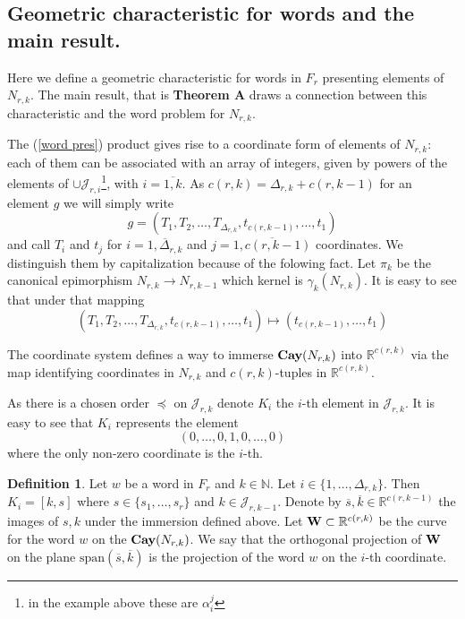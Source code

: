 \documentclass[11pt]{amsart}
\theoremstyle{plain}
\theoremstyle{definition}
\newtheorem{Definition}[Theorem]{Definition}
\numberwithin{equation}{section}
\newcommand{\Cay}{\text{\bf Cay}}
\newcommand{\N}{N_{r,k}}
\newcommand{\JJ}{\mathcal{J}_{r,k}}
\newcommand{\RR}{\mathbb{R}}
\newcommand{\ssspan}{\text{span}}
\begin{document}
\subsection{Geometric characteristic for words and the main result.}


Here we define a geometric characteristic for words in $F_r$ presenting elements of $N_{r,k}$. The main result, that is {\bf Theorem A} draws a connection between this characteristic and the word problem for $N_{r,k}$.

The (\ref{word pres}) product gives rise to a coordinate form of elements of $\N$: each of them can be associated with an array of integers, given by powers of the elements of $\cup \mathcal{J}_{r,i}$\footnote{in the example above these are $\alpha_i^j$}, with $i=\overline{1,k}$. As $c(r,k) = \Delta_{r,k}+c(r,k-1)$ for an element $g$ we will simply write
$$g = (T_1,T_2,\ldots, T_{\Delta_{r,k}},t_{c(r,k-1)},\ldots, t_1)$$
and call $T_i$ and $t_j$ for $i=\overline{1,\Delta_{r,k}}$ and $j =\overline{1,c(r,k-1)}$ coordinates. We distinguish them by capitalization because of the folowing fact. Let $\pi_k$ be the canonical epimorphism $N_{r,k}\to N_{r,k-1}$ which kernel is $\gamma_k(N_{r,k})$. It is easy to see that under that mapping 
$$(T_1,T_2,\ldots, T_{\Delta_{r,k}},t_{c(r,k-1)},\ldots, t_1) \mapsto (t_{c(r,k-1)},\ldots, t_1)$$


The coordinate system defines a way to immerse $\Cay(\N)$ into $\RR^{c(r,k)}$ via the map identifying coordinates in $N_{r,k}$ and $c(r,k)$-tuples in $\RR^{c(r,k)}$.

As there is a chosen order $\preccurlyeq$ on $\JJ$ denote $K_i$ the $i$-th element in $\JJ$. It is easy to see that $K_i$ represents the element
$$(0,\ldots, 0,1,0,\ldots,0)$$
where the only non-zero coordinate is the $i$-th.



\begin{Definition}
Let $w$ be a word in $F_r$ and $k\in \mathbb{N}$. Let $i\in \{1,\ldots,\Delta_{r,k}\}$.  Then $K_i = [k,s]$ where $s\in \{s_1,\ldots, s_r\}$ and $k\in \mathcal{J}_{r,k-1}$. Denote by $\overline{s}, \overline{k}\in \RR^{c(r,k-1)}$ the images of $s,k$ under the immersion defined above.
Let ${\bf W}\subset \RR^{c(r,k)}$ be the curve for the word $w$ on the $\Cay(\N)$. We say that the orthogonal projection of ${\bf W}$ on the plane $\ssspan(\overline{s}, \overline{k})$ is the projection of the word $w$ on the $i$-th coordinate.
\end{Definition}
\end{document}
